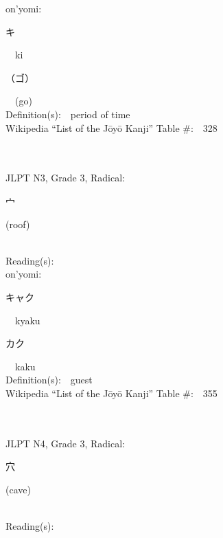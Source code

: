 \begin{multicols}{2}
{\hspace*{1em}}on'yomi:\ \ \\
{\hspace*{2em}}{\begin{CJK}{UTF8}{min} キ \end{CJK}}\ \ ki\ \ \\
{\hspace*{2em}}{\begin{CJK}{UTF8}{min} （ゴ） \end{CJK}}\ \ (go)\ \ \\
Definition(s):\ \ period of time \\
Wikipedia ``List of the J\=oy\=o Kanji'' Table \#:\ \ 328 \\
\ \ \\
{\fontsize{34pt}{40pt}  }\ \ \\  %
{JLPT N3, Grade 3, Radical:\ \ {\begin{CJK}{UTF8}{min} 宀 \end{CJK}} (roof) } \\
Reading(s):\ \ \\
{\hspace*{1em}}on'yomi:\ \ \\
{\hspace*{2em}}{\begin{CJK}{UTF8}{min} キャク \end{CJK}}\ \ kyaku\ \ \\
{\hspace*{2em}}{\begin{CJK}{UTF8}{min} カク \end{CJK}}\ \ kaku\ \ \\
Definition(s):\ \ guest \\
Wikipedia ``List of the J\=oy\=o Kanji'' Table \#:\ \ 355 \\
\ \ \\
{\fontsize{34pt}{40pt}  }\ \ \\  %
{JLPT N4, Grade 3, Radical:\ \ {\begin{CJK}{UTF8}{min} 穴 \end{CJK}} (cave) } \\
Reading(s):\ \ \\

\end{multicols}

